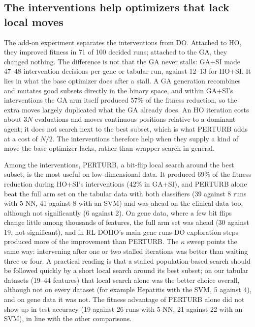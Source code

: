 \documentclass[journal]{IEEEtran}
\begin{document}
\subsection{The interventions help optimizers that lack local moves}
The add-on experiment separates the interventions from DO. Attached to HO, they improved fitness in 71 of 100 decided runs; attached to the GA, they changed nothing. The difference is not that the GA never stalls: GA+SI made 47--48 intervention decisions per gene or tabular run, against 12--13 for HO+SI. It lies in what the base optimizer does after a stall. A GA generation recombines and mutates good subsets directly in the binary space, and within GA+SI's interventions the GA arm itself produced 57\% of the fitness reduction, so the extra moves largely duplicated what the GA already does. An HO iteration costs about $3N$ evaluations and moves continuous positions relative to a dominant agent; it does not search next to the best subset, which is what PERTURB adds at a cost of $N/2$. The interventions therefore help when they supply a kind of move the base optimizer lacks, rather than wrapper search in general.

Among the interventions, PERTURB, a bit-flip local search around the best subset, is the most useful on low-dimensional data. It produced 69\% of the fitness reduction during HO+SI's interventions (42\% in GA+SI), and PERTURB alone beat the full arm set on the tabular data with both classifiers (39 against 8 runs with 5-NN, 41 against 8 with an SVM) and was ahead on the clinical data too, although not significantly (6 against 2). On gene data, where a few bit flips change little among thousands of features, the full arm set was ahead (30 against 19, not significant), and in RL-DOHO's main gene runs DO exploration steps produced more of the improvement than PERTURB. The $\kappa$ sweep points the same way: intervening after one or two stalled iterations was better than waiting three or four. A practical reading is that a stalled population-based search should be followed quickly by a short local search around its best subset; on our tabular datasets (19--44 features) that local search alone was the better choice overall, although not on every dataset (for example Hepatitis with the SVM, 5 against 4), and on gene data it was not. The fitness advantage of PERTURB alone did not show up in test accuracy (19 against 26 runs with 5-NN, 21 against 22 with an SVM), in line with the other comparisons.
\end{document}
